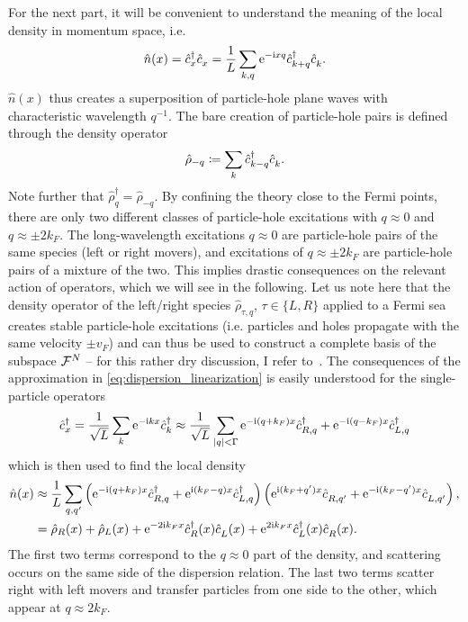For the next part, it will be convenient to understand the meaning of the local density in momentum space, i.e.
\begin{align}
    \hat n(x) = \hat c^\dag_x \hat c^\pdag_x = \frac1L\sum_{k,q}\re^{-\ri x q}\hat c^\dag_{k+q}\hat c^\pdag_{k}.
    \label{eq:local_density}
\end{align}
$\hat n(x)$ thus creates a superposition of particle-hole plane waves with characteristic wavelength $q^{-1}$.
The bare creation of particle-hole pairs is defined through the density operator
\begin{align}
    \hat \rho_{-q}\coloneqq \sum_k \hat c^\dag_{k-q}\hat c^\pdag_{k}.
\end{align}
Note further that $\hat\rho_q^\dag = \hat\rho_{-q}$.
By confining the theory close to the Fermi points, there are only two different classes of particle-hole excitations with $q\approx 0$ and $q\approx\pm2k_F$.
The long-wavelength excitations $q\approx0$ are particle-hole pairs of the same species (left or right movers), and excitations of $q\approx\pm2k_F$ are particle-hole pairs of a mixture of the two.
This implies drastic consequences on the relevant action of operators, which we will see in the following.
Let us note here that the density operator of the left/right species $\hat\rho_{\tau,q}$, $\tau\in\{L,R\}$ applied to a Fermi sea creates stable particle-hole excitations (i.e. particles and holes propagate with the same velocity $\pm v_F$) and can thus be used to construct a complete basis of the subspace $\mathcal{F}^N$ -- for this rather dry discussion, I refer to~\cite{vonDelft1998}.
The consequences of the approximation in \cref{eq:dispersion_linearization} is easily understood for the single-particle operators
\begin{align}
    \hat c^\dag_x = \frac1{\sqrt L}\sum_k \mathrm e^{-\mathrm i k x}\hat c^\dag_k \approx \frac1{\sqrt L}\sum_{|q|<\Gamma}\mathrm e^{-\mathrm i (q+k_F) x}\hat c^\dag_{R, q} + \mathrm e^{-\mathrm i (q-k_F) x}\hat c^\dag_{L, q}
    \label{eq:confinement_creation_annihilation}
\end{align}
which is then used to find the local density
\begin{align}
    \hat n(x)
    &\approx \frac1L\sum_{q,q'}\brlr{\re^{-\ri (q+k_F) x}\hat c^\dag_{R, q} + \re^{\ri (k_F-q) x}\hat c^\dag_{L, q}}\brlr{\re^{\ri (k_F+q') x}\hat c^\pdag_{R, q'} + \re^{-\ri (k_F-q') x}\hat c^\pdag_{L, q'}},
    \\
    &= \hat \rho_R(x) + \hat \rho_L(x) + \re^{-2\ri k_Fx}\hat c^\dag_{R}(x)\hat c^\pdag_{L}(x) + \re^{2\ri k_Fx}\hat c^\dag_{L}(x)\hat c^\pdag_{R}(x).
    \label{eq:local_density_approximation}
\end{align}
The first two terms correspond to the $q\approx0$ part of the density, and scattering occurs on the same side of the dispersion relation.
The last two terms scatter right with left movers and transfer particles from one side to the other, which appear at $q\approx2k_F$.

